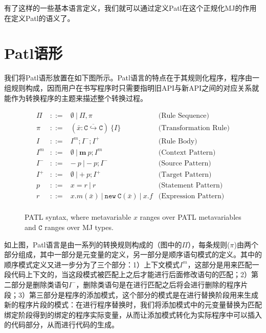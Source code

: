 有了这样的一些基本语言定义，我们就可以通过定义Patl在这个正规化MJ的作用在定义Patl的语义了。

\section{Patl语形}
我们将Patl语形放置在如下图所示。Patl语言的特点在于其规则化程序，程序由一组规则构成，因而用户在书写程序时只需要指明旧API与新API之间的对应关系就能作为转换程序的主题来描述整个转换过程。

\begin{figure}[ht]
\[
\begin{array}{ccllcccc}
   \Pi 	&::=&  	\emptyset ~|~ \Pi,\pi & \text{(Rule Sequence)}\\
   \pi 	&::=&  	(\bar{x}:\overline{\mathtt{C}\hookrightarrow\mathtt{C}})~\{I\} & \text{(Transformation Rule)}\\
   I 	&::=& 	I^{m};I^{-};I^{+} 	&	\text{(Rule Body)}\\
   I^{m}&::=& 	\emptyset ~|~ \mathbf{m}~p;I^{m}	& \text{(Context Pattern)}\\
   I^{-}&::=& 	\mathit{-}~p ~|~ \mathit{-}~p;I^{-} & \text{(Source Pattern)}\\
   I^{+}&::=& 	\emptyset ~|~ \mathit{+}~p;I^{+} 	& \text{(Target Pattern)}\\
   p 	&::=& 	x = r ~|~ r	 & \text{(Statement Pattern)}\\
   r 	&::=&	x.m(\bar{x}) ~|~ \mathtt{new~C}(\bar{x}) ~|~ x.f & \text{(Expression Pattern)}\\
\end{array}
\]
\caption{PATL syntax, where metavariable $x$ ranges over PATL metavariables and $\mathtt{C}$ ranges over MJ types.}
\label{fg-syntax}
\end{figure}

如上图，Patl语言是由一系列的转换规则构成的（图中的$\Pi$），每条规则($\pi$)由两个部分组成，其中一部分是元变量的定义，另一部分是顺序语句模式的定义。其中的顺序模式定义又进一步分为了三个部分：1）上下文模式$I^{m}$，这部分是用来匹配一段代码上下文的，当这段模式被匹配上之后才能进行后面修改语句的匹配；2）第二部分是删除类语句$I^-$，删除类语句是在进行匹配之后将会进行删除的程序片段；3）第三部分是程序的添加模式，这个部分的模式是在进行替换阶段用来生成新的程序片段的模式：在进行程序替换时，我们将添加模式中的元变量替换为匹配绑定阶段得到的绑定的程序实际变量，从而让添加模式转化为实际程序中可以插入的代码部分，从而进行代码的生成。

